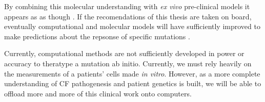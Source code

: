 By combining this molecular understanding with \textit{ex vivo} pre-clinical models it appears as as though . If the recomendations of this thesis are taken on board, eventually computational and molecular models will have sufficiently improved to make predictions about the repsonse of specific mutations .  

Currently, computational methods are not sufficiently developed in power or accuracy to theratype a mutation ab initio. Currently, we must rely heavily on the measurements of a patients' cells made \textit{in vitro}. However, as a more complete understanding of CF pathogenesis and patient genetics is built, we will be able to offload more and more of this clinical work onto computers.
